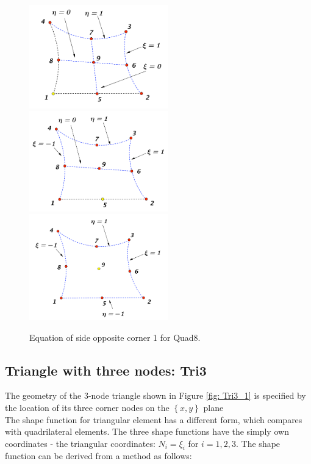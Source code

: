 \documentclass{article}
\begin{document}
\begin{figure}[h]
	\begin{center}
		\includegraphics[width=6cm,clip]{Quad8_2.pdf} \label{fig: Quad8_2}	
		\includegraphics[width=6cm,clip]{Quad8_3.pdf}	
		\includegraphics[width=6cm,clip]{Quad8_4.pdf}
		\caption{Equation of side opposite corner 1 for Quad8.}
	\end{center} 
\end{figure}

\subsection{Triangle with three nodes: Tri3}
The geometry of the 3-node triangle shown in Figure \ref{fig: Tri3_1} is specified by the location of its three corner nodes on the $\left\{x, y\right\}$ plane \\

The shape function for triangular element has a different form, which compares with quadrilateral elements. The three shape functions have the simply own coordinates - the triangular coordinates: $N_i = \xi_i$ for $i = 1, 2, 3.$ The shape function can be derived from a method as follows: \\
\end{document}
